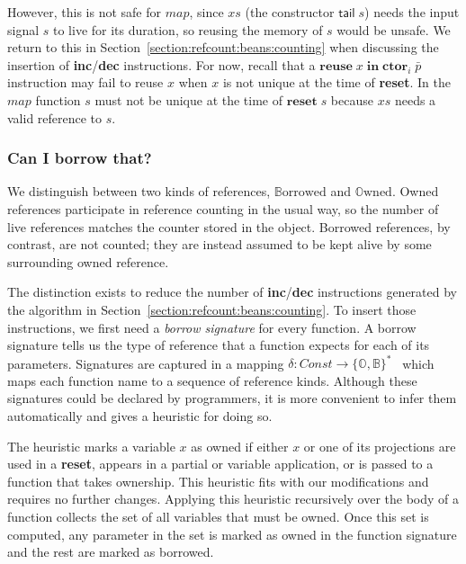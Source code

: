 However, this is not safe for $map$, since $xs$ (the constructor $\mathsf{tail} \; s$) needs the input signal $s$ to live for its duration, so reusing the memory of $s$ would be unsafe. We return to this in Section~\ref{section:refcount:beans:counting} when discussing the insertion of \textbf{inc}/\textbf{dec} instructions. 
For now, recall that a $\mathbf{reuse} \; x \; \mathbf{in} \; \mathbf{ctor}_i \; \bar p$ instruction may fail to reuse $x$ when $x$ is not unique at the time of \textbf{reset}. In the $map$ function $s$ must not be unique at the time of $\mathbf{reset} \; s$ because $xs$ needs a valid reference to $s$.


\subsubsection{Can I borrow that?}\label{section:refcount:beans:collect}

We distinguish between two kinds of references, $\mathbb{B}\text{orrowed}$ and $\mathbb{O}\text{wned}$. Owned references participate in reference counting in the usual way, so the number of live references matches the counter stored in the object. Borrowed references, by contrast, are not counted; they are instead assumed to be kept alive by some surrounding owned reference.

The distinction exists to reduce the number of \textbf{inc}/\textbf{dec} instructions generated by the algorithm in Section~\ref{section:refcount:beans:counting}. 
To insert those instructions, we first need a \textit{borrow signature} for every function. 
A borrow signature tells us the type of reference that a function expects for each of its parameters. Signatures are captured in a mapping $\delta : Const \to \{\mathbb{O}, \mathbb{B}\}^*$~\cite{ullrich_counting_2021} which maps each function name to a sequence of reference kinds. 
Although these signatures could be declared by programmers, it is more convenient to infer them automatically and \citeauthor*{ullrich_counting_2021} gives a heuristic for doing so. 

The heuristic marks a variable $x$ as owned if either $x$ or one of its projections are used in a \textbf{reset}, appears in a partial or variable application, or is passed to a function that takes ownership. 
This heuristic fits with our modifications and requires no further changes.
Applying this heuristic recursively over the body of a function collects the set of all variables that must be owned. Once this set is computed, any parameter in the set is marked as owned in the function signature and the rest are marked as borrowed.

